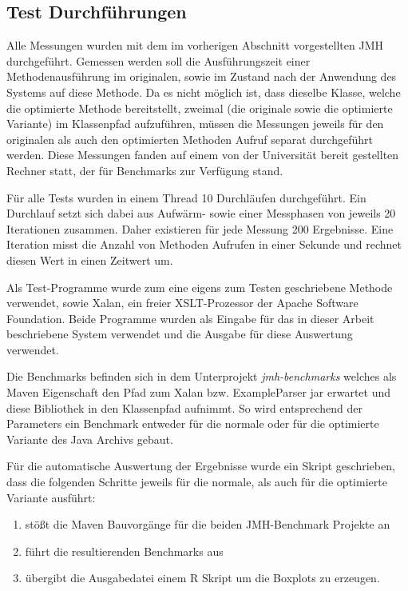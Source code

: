 \subsection{Test Durchführungen}

Alle Messungen wurden mit dem im vorherigen Abschnitt vorgestellten JMH durchgeführt. 
Gemessen werden soll die Ausführungszeit einer Methodenausführung im originalen, sowie
im Zustand nach der Anwendung des Systems auf diese Methode. Da es nicht möglich ist,
dass dieselbe Klasse, welche die optimierte Methode bereitstellt, zweimal (die originale 
sowie die optimierte Variante) im Klassenpfad aufzuführen, müssen die Messungen
jeweils für den originalen als auch den optimierten Methoden Aufruf separat durchgeführt werden.
Diese Messungen fanden auf einem von der Universität bereit gestellten Rechner statt,
der für Benchmarks zur Verfügung stand. 

Für alle Tests wurden in einem Thread 10 Durchläufen durchgeführt. Ein Durchlauf setzt
sich dabei aus Aufwärm- sowie einer Messphasen von jeweils 20 Iterationen zusammen. 
Daher existieren für jede Messung 200 Ergebnisse. Eine Iteration misst die Anzahl von 
Methoden Aufrufen in einer Sekunde und rechnet diesen Wert in einen Zeitwert um. 

Als Test-Programme wurde zum eine eigens zum Testen geschriebene Methode verwendet, 
sowie Xalan, ein freier XSLT-Prozessor der Apache Software Foundation. Beide Programme
wurden als Eingabe für das in dieser Arbeit beschriebene System verwendet und die
Ausgabe für diese Auswertung verwendet.

Die Benchmarks befinden sich in dem Unterprojekt \textit{jmh-benchmarks} welches als
Maven Eigenschaft den Pfad zum Xalan bzw. ExampleParser jar erwartet und diese
Bibliothek in den Klassenpfad aufnimmt. So wird entsprechend der Parameters ein
Benchmark entweder für die normale oder für die optimierte Variante des Java Archivs
gebaut. 

Für die automatische Auswertung der Ergebnisse wurde ein Skript geschrieben, dass die 
folgenden Schritte jeweils für die normale, als auch für die optimierte Variante ausführt:

\begin{enumerate}
	\item stößt die Maven Bauvorgänge für die beiden JMH-Benchmark Projekte an
	\item führt die resultierenden Benchmarks aus
	\item übergibt die Ausgabedatei einem R Skript um die Boxplots zu erzeugen. 
\end{enumerate}

